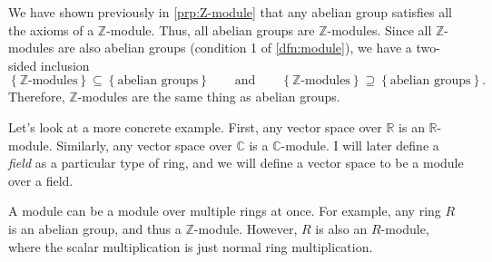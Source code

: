 \begin{example}\label{ex:module-1}
	We have shown previously in \cref{prp:Z-module} that any abelian group satisfies all the axioms of a $\mathbb{Z} $-module. Thus, all abelian groups are $\mathbb{Z} $-modules. Since all $\mathbb{Z} $-modules are also abelian groups (condition 1 of \cref{dfn:module}), we have a two-sided inclusion
	\[ 
		\left\{ \mathbb{Z} \text{-modules}  \right\} \subseteq \left\{ \text{abelian groups}  \right\} \qquad \text{and} \qquad \left\{ \mathbb{Z} \text{-modules}  \right\} \supseteq \left\{ \text{abelian groups}  \right\} 
	.\]
	Therefore, $\mathbb{Z} $-modules are the same thing as abelian groups.
\end{example}

\begin{example}\label{ex:module-2}
	Let's look at a more concrete example. First, any vector space over $\mathbb{R} $ is an $\mathbb{R} $-module. Similarly, any vector space over $\mathbb{C} $ is a $\mathbb{C} $-module. I will later define a \emph{field} as a particular type of ring, and we will define a vector space to be a module over a field.
\end{example}

\begin{example}\label{ex:module-3}
	A module can be a module over multiple rings at once. For example, any ring $R$ is an abelian group, and thus a $\mathbb{Z} $-module. However, $R$ is also an $R$-module, where the scalar multiplication is just normal ring multiplication.
\end{example}


